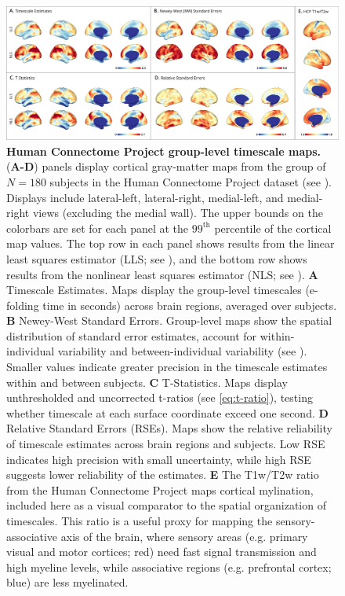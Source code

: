 \documentclass[latex/main.tex]{subfiles}
\begin{document}
\begin{figure}[H]
    \centering
    \includegraphics[width=1\textwidth]{latex/results/fig05-hcp180.png} 
    \caption{
    \textbf{Human Connectome Project group-level timescale maps.}
    (\textbf{A-D}) panels display cortical gray-matter maps from the group of $N=180$ subjects in the Human Connectome Project dataset (see ). Displays include lateral-left, lateral-right, medial-left, and medial-right views (excluding the medial wall). The upper bounds on the colorbars are set for each panel at the $99^\text{th}$ percentile of the cortical map values. The top row in each panel shows results from the linear least squares estimator (LLS; see ), and the bottom row shows results from the nonlinear least squares estimator (NLS; see ). 
    \textbf{A} Timescale Estimates. Maps display the group-level timescales (e-folding time in seconds) across brain regions, averaged over subjects.
    \textbf{B} Newey-West Standard Errors. Group-level maps show the spatial distribution of standard error estimates, account for within-individual variability and between-individual variability (see ). Smaller values indicate greater precision in the timescale estimates within and between subjects.
    \textbf{C} T-Statistics. Maps display unthresholded and uncorrected t-ratios (see \eqref{eq:t-ratio}), testing whether timescale at each surface coordinate exceed one second.
    \textbf{D} Relative Standard Errors (RSEs). Maps show the relative reliability of timescale estimates across brain regions and subjects. Low RSE indicates high precision with small uncertainty, while high RSE suggests lower reliability of the estimates.
    \textbf{E} The T1w/T2w ratio from the Human Connectome Project maps cortical mylination, included here as a visual comparator to the spatial organization of timescales. This ratio is a useful proxy for mapping the sensory-associative axis of the brain, where sensory areas (e.g. primary visual and motor cortices; red) need fast signal transmission and high myeline levels, while associative regions (e.g. prefrontal cortex; blue) are less myelinated.
    }
    \label{fig:map-hcp180}
\end{figure}
\end{document}
